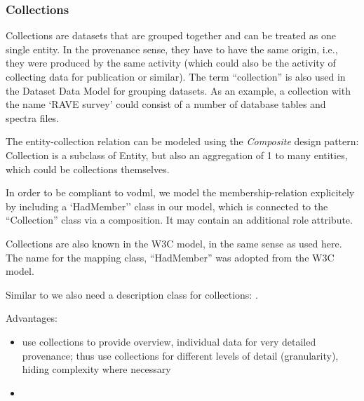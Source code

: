 \subsubsection{Collections}
Collections are datasets that are grouped together and can be treated as one single entity. 
In the provenance sense, they have to have the same origin, i.e., they were 
produced by the same activity (which could also be the activity of collecting
data for publication or similar). The term ``collection'' is 
also used in the Dataset Data Model for grouping datasets. As an example, a collection 
with the name `RAVE survey' could consist of a number of database tables and spectra files.

The entity-collection relation can be modeled using the \emph{Composite} design pattern: 
Collection is a subclass of Entity, but also an aggregation of 1 to many entities, 
which could be collections themselves. 

In order to be compliant to vodml, we model the membership-relation explicitely 
by including a `HadMember'' class in our model, which is connected to the
``Collection'' class via a composition. It may contain an additional role attribute.

Collections are also known in the W3C model, in the same sense as used here. 
The name for the mapping class, ``HadMember'' was adopted from the W3C model.


Similar to  we also need a description class for collections: 
. 


Advantages:
\begin{itemize}
\item use collections to provide overview, individual data for very detailed provenance; 
	  thus use collections for different levels of detail (granularity), hiding 
	  complexity where necessary
\item {}
\end{itemize}







